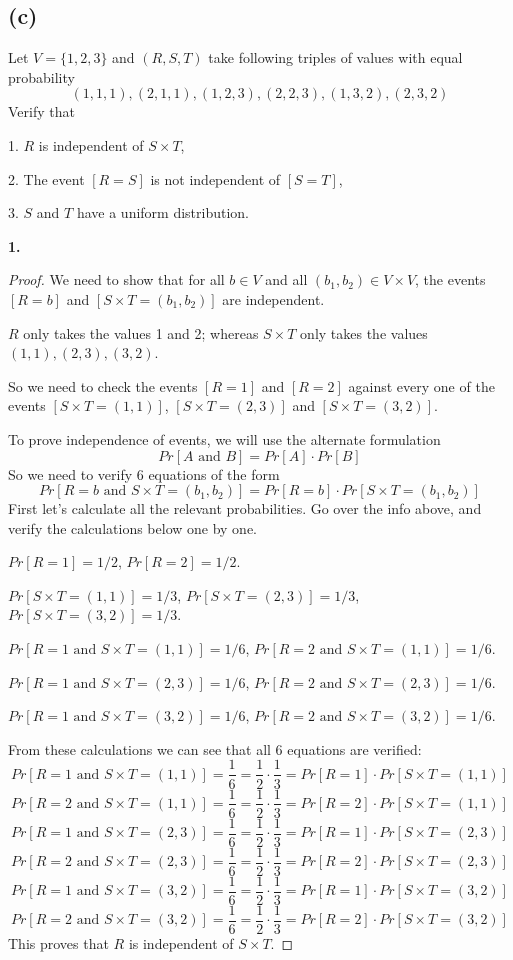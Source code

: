 \documentclass[14pt]{extarticle}
\begin{document}
\subsection{(c)}
Let $V = \{1, 2, 3\}$ and $(R, S, T)$ take following triples of values with equal probability
$$
(1, 1, 1), (2, 1, 1), (1, 2, 3), (2, 2, 3), (1, 3, 2), (2, 3, 2)
$$
Verify that

1. $R$ is independent of $S \times T$,

2. The event $[R = S]$ is not independent of $[S = T]$,

3. $S$ and $T$ have a uniform distribution.

{\bf 1.} 
\begin{proof}
We need to show that for all $b \in V$ and all $(b_1, b_2) \in V \times V$, the events $[R = b]$ and $[S \times T = (b_1, b_2)]$ are independent.

$R$ only takes the values 1 and 2; whereas $S \times T$ only takes the values $(1,1), (2,3), (3,2)$. 

So we need to check the events $[R = 1]$ and $[R = 2]$ against every one of the events $[S \times T = (1,1)]$, $[S \times T = (2,3)]$ and $[S \times T = (3,2)]$. 

To prove independence of events, we will use the alternate formulation 
$$
Pr[A \text{ and }B] = Pr[A]\cdot Pr[B]
$$ 
So we need to verify 6 equations of the form 
$$
Pr[R = b \text{ and } S \times T = (b_1, b_2)] = Pr[R = b] \cdot Pr[S \times T = (b_1, b_2)]
$$
First let's calculate all the relevant probabilities. Go over the info above, and verify the calculations below one by one.

$Pr[R = 1] = 1/2$, $Pr[R = 2] = 1/2$.

$Pr[S \times T = (1,1)] = 1/3$, $Pr[S \times T = (2,3)] = 1/3$, $Pr[S \times T = (3,2)] = 1/3$.

$Pr[R = 1 \text{ and } S \times T = (1,1)] = 1/6$, $Pr[R = 2 \text{ and } S \times T = (1,1)] = 1/6$. 

$Pr[R = 1 \text{ and } S \times T = (2,3)] = 1/6$, $Pr[R = 2 \text{ and } S \times T = (2,3)] = 1/6$. 

$Pr[R = 1 \text{ and } S \times T = (3,2)] = 1/6$, $Pr[R = 2 \text{ and } S \times T = (3,2)] = 1/6$. 

From these calculations we can see that all 6 equations are verified:  
$$
Pr[R = 1 \text{ and } S \times T = (1,1)] = \frac{1}{6} = \frac{1}{2} \cdot \frac{1}{3} = Pr[R = 1] \cdot Pr[S \times T = (1,1)]
$$
$$
Pr[R = 2 \text{ and } S \times T = (1,1)] = \frac{1}{6} = \frac{1}{2} \cdot \frac{1}{3} = Pr[R = 2] \cdot Pr[S \times T = (1,1)]
$$
$$
Pr[R = 1 \text{ and } S \times T = (2,3)] = \frac{1}{6} = \frac{1}{2} \cdot \frac{1}{3} = Pr[R = 1] \cdot Pr[S \times T = (2,3)]
$$
$$
Pr[R = 2 \text{ and } S \times T = (2,3)] = \frac{1}{6} = \frac{1}{2} \cdot \frac{1}{3} = Pr[R = 2] \cdot Pr[S \times T = (2,3)]
$$
$$
Pr[R = 1 \text{ and } S \times T = (3,2)] = \frac{1}{6} = \frac{1}{2} \cdot \frac{1}{3} = Pr[R = 1] \cdot Pr[S \times T = (3,2)]
$$
$$
Pr[R = 2 \text{ and } S \times T = (3,2)] = \frac{1}{6} = \frac{1}{2} \cdot \frac{1}{3} = Pr[R = 2] \cdot Pr[S \times T = (3,2)]
$$
This proves that $R$ is independent of $S \times T$.
\end{proof}
\end{document}

